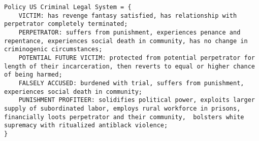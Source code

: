 \documentclass{article}
\begin{document}
\begin{lstlisting}[breaklines]
Policy US Criminal Legal System = {
    VICTIM: has revenge fantasy satisfied, has relationship with perpetrator completely terminated; 
    PERPETRATOR: suffers from punishment, experiences penance and repentance, experiences social death in community, has no change in criminogenic circumstances; 
    POTENTIAL FUTURE VICTIM: protected from potential perpetrator for length of their incarceration, then reverts to equal or higher chance of being harmed; 
    FALSELY ACCUSED: burdened with trial, suffers from punishment, experiences social death in community;
    PUNISHMENT PROFITEER: solidifies political power, exploits larger supply of subordinated labor, employs rural workforce in prisons, financially loots perpetrator and their community,  bolsters white supremacy with ritualized antiblack violence;
}
\end{lstlisting} 



\end{document}

